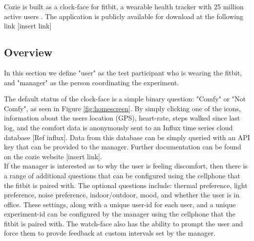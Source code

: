 
Cozie is built as a clock-face for fitbit, a wearable health tracker with 25 million active users \cite{fibit2018}. The application is publicly available for download at the following link [insert link]

\subsection{Overview}

In this section we define "user" as the test participant who is wearing the fitbit, and "manager" as the person coordinating the experiment. \ 

The default status of the clock-face is a simple binary question: "Comfy" or "Not Comfy", as seen in Figure \ref{fig:homescreen}. By simply clicking one of the icons, information about the users location (GPS), heart-rate, steps walked since last log, and the comfort data is anonymously sent to an Influx time series cloud database [Ref influx]. Data from this database can be simply queried with an API key that can be provided to the manager. Further documentation can be found on the cozie website [insert link].\\

If the manager is interested as to why the user is feeling discomfort, then there is a range of additional questions that can be configured using the cellphone that the fitbit is paired with. The optional questions include: thermal preference, light preference, noise preference, indoor/outdoor, mood, and whether the user is in office. These settings, along with a unique user-id for each user, and a unique experiment-id can be configured by the manager using the cellphone that the fitbit is paired with. The watch-face also has the ability to prompt the user and force them to provde feedback at custom intervals set by the manager.


